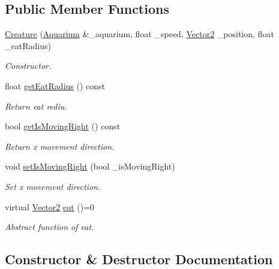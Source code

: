 \subsection*{Public Member Functions}
\begin{DoxyCompactItemize}
\item 
\mbox{\hyperlink{class_creature_ab12ad708dcef6c9cd0509f6769a6329a}{Creature}} (\mbox{\hyperlink{class_aquarium}{Aquarium}} \&\+\_\+aquarium, float \+\_\+speed, \mbox{\hyperlink{struct_vector2}{Vector2}} \+\_\+position, float \+\_\+eat\+Radius)
\begin{DoxyCompactList}\small\item\em Constructor. \end{DoxyCompactList}\item 
float \mbox{\hyperlink{class_creature_a24e52cedddd872269f83671c9a6f6925}{get\+Eat\+Radius}} () const
\begin{DoxyCompactList}\small\item\em Return eat rediu. \end{DoxyCompactList}\item 
bool \mbox{\hyperlink{class_creature_a63abd829cfac5d57425452b39f2a21b7}{get\+Is\+Moving\+Right}} () const
\begin{DoxyCompactList}\small\item\em Return x movement direction. \end{DoxyCompactList}\item 
void \mbox{\hyperlink{class_creature_a7b222797d42b668ebf2a02eef51feaf8}{set\+Is\+Moving\+Right}} (bool \+\_\+is\+Moving\+Right)
\begin{DoxyCompactList}\small\item\em Set x movement direction. \end{DoxyCompactList}\item 
virtual \mbox{\hyperlink{struct_vector2}{Vector2}} \mbox{\hyperlink{class_creature_a0d531a4c04c1021833ddb0e48864dbf4}{eat}} ()=0
\begin{DoxyCompactList}\small\item\em Abstract function of eat. \end{DoxyCompactList}\end{DoxyCompactItemize}


\subsection{Constructor \& Destructor Documentation}
\mbox{\label{class_creature_ab12ad708dcef6c9cd0509f6769a6329a}} 

